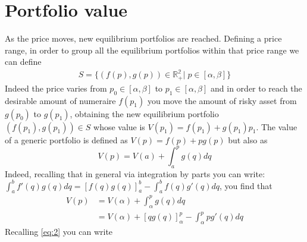 \documentclass[12pt]{article}
\begin{document}
\section{Portfolio value}
As the price moves, new equilibrium portfolios are reached. Defining a price range, in order to group all the equilibrium portfolios within that price range we can define
\begin{align*}
    S=\{(f(p),g(p))\in\mathbb{R^\text{2}_+}|\;p\in [\alpha,\beta]\}
\end{align*}
Indeed the price varies from $p_0\in [\alpha,\beta]$ to $p_1\in [\alpha,\beta]$ and in order to reach the desirable amount of numeraire $f(p_1)$ you move the amount of risky asset from $g(p_0)$ to $g(p_1)$, obtaining the new equilibrium portfolio $(f(p_1),g(p_1))\in S$ whose value is $V(p_1)=f(p_1)+g(p_1)p_1$.
\newline
The value of a generic portfolio is defined as $V(p)=f(p)+pg(p)$ but also as
\begin{equation}
    V(p) =V(a) +\int_{a}^p g(q) dq \label{eq:4}
\end{equation}
Indeed, recalling that in general via integration by parts you can write: \newline$\int^{b}_{a}f'(q)g(q) dq = [f(q)g(q)]_{a}^{b} - \int^{b}_{a}f(q)g'(q) dq$,
you find that
\begin{align*}
    V(p) & =V(\alpha) +\int_{\alpha}^p g(q) dq                              \\
         & = V(\alpha) + [q g(q)]_{\alpha}^{p} - \int_{\alpha}^p p g'(q) dq
\end{align*}
Recalling \eqref{eq:2} you can write
\end{document}
